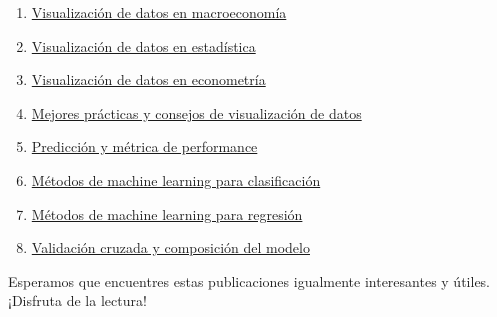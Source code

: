\documentclass[
  a4paper,
]{article}
\begin{document}
\begin{enumerate}
{  de datos en microeconomía}
\item
  \href{../2023-07-04-visualizacion-de-datos-en-macroeconomia-con-python/index.qmd}{Visualización
  de datos en macroeconomía}
\item
  \href{../2023-07-05-visualizacion-de-datos-en-estadistica-con-python/index.qmd}{Visualización
  de datos en estadística}
\item
  \href{../2023-07-06-visualizacion-de-datos-en-econometria-con-python/index.qmd}{Visualización
  de datos en econometría}
\item
  \href{../2023-07-07-mejores-practicas-y-consejos-de-visualizacion-de-datos-con-python/index.qmd}{Mejores
  prácticas y consejos de visualización de datos}
\item
  \href{../2023-07-08-08-prediccion-y-metrica-de-performance-con-python/index.qmd}{Predicción
  y métrica de performance}
\item
  \href{../2023-07-09-09-metodos-de-machine-learning-para-clasificacion-con-python/index.qmd}{Métodos
  de machine learning para clasificación}
\item
  \href{../2023-07-10-10-metodos-de-machine-learning-para-regresion-con-python/index.qmd}{Métodos
  de machine learning para regresión}
\item
  \href{../2023-07-11-11-validacion-cruzada-y-composicion-del-modelo-con-python/index.qmd}{Validación
  cruzada y composición del modelo}
\end{enumerate}

Esperamos que encuentres estas publicaciones igualmente interesantes y
útiles. ¡Disfruta de la lectura!


\printbibliography
\end{document}
